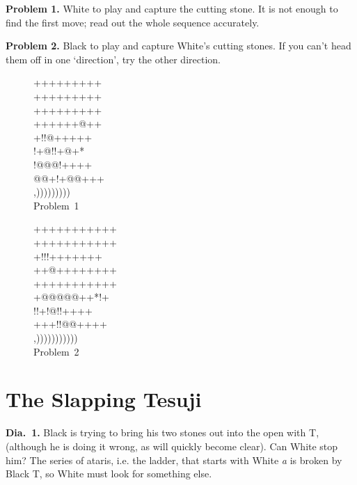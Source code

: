 \documentclass[royalvopaper,10pt,twoside,onecolumn,draft]{memoir}
\begin{document}
\noindent
\textbf{Problem 1.} White to play and capture the cutting stone. It is not enough
to find the first move; read out the whole sequence accurately.

\noindent
\textbf{Problem 2.} Black to play and capture White's cutting stones. If you can't
head them off in one `direction', try the other direction.
\begin{figure}[ht]
    \begin{minipage}[c]{0.5\linewidth}
        \centering    
        {\gnos%
        +++++++++\\
        +++++++++\\
        +++++++++\\
        ++++++@++\\
        +!!@+++++\\
        !+@!!+@+*\\
        !@@@!++++\\
        @@+!+@@+++\\
        ,)))))))))\\
        }
        Problem\ 1
    \end{minipage}%
    \begin{minipage}[c]{0.5\linewidth}
        \centering    
        {\gnos%
        +++++++++++\\
        +++++++++++\\
        +!!!+++++++\\
        ++@++++++++\\
        +++++++++++\\
        +@@@@@++*!+\\
        !!+!@!!++++\\
        +++!!@@++++\\
        ,)))))))))))\\
        }
        Problem\ 2
    \end{minipage}%
\end{figure}

\section{The Slapping Tesuji}
\noindent
\textbf{Dia.\ 1.} Black is trying to bring his two stones out into the open with {\gnos T},
(although he is doing it wrong, as will quickly become clear). Can
White stop him? The series of ataris, i.e. the ladder, that starts with
White \textit{a} is broken by Black {\gnos T}, so White must look for something else.
\end{document}
